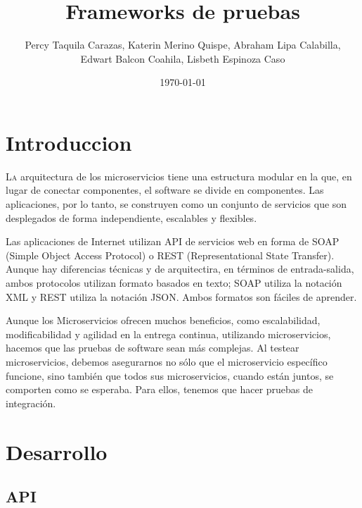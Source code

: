 \documentclass[twoside,twocolumn]{article}
\title{Frameworks de pruebas}
\author{Percy Taquila Carazas, Katerin Merino Quispe, Abraham Lipa Calabilla,
\\Edwart Balcon Coahila, Lisbeth Espinoza Caso}
\date{\today}
\begin{document}
\maketitle


\section{Introduccion}


\lettrine[nindent=0em,lines=3]{L}a arquitectura de los microservicios tiene una estructura modular en la que, en lugar de conectar componentes, el software se divide en componentes. Las aplicaciones, por lo tanto, se construyen como un conjunto de servicios que son desplegados de forma independiente, escalables y flexibles.

Las aplicaciones de Internet utilizan API de servicios web en forma de SOAP (Simple Object Access Protocol) o REST (Representational State Transfer). Aunque hay diferencias técnicas y de arquitectira, en términos de entrada-salida, ambos protocolos utilizan formato basados en texto; SOAP utiliza la notación XML y REST utiliza la notación JSON. Ambos formatos son fáciles de aprender.

Aunque los Microservicios ofrecen muchos beneficios, como escalabilidad, modificabilidad y agilidad en la entrega continua, utilizando microservicios, hacemos que las pruebas de software sean más complejas. Al testear microservicios, debemos asegurarnos no sólo que el microservicio específico funcione, sino también que todos sus microservicios, cuando están juntos, se comporten como se esperaba. Para ellos, tenemos que hacer pruebas de integración. 




\section{Desarrollo}

\subsection{API}
\end{document}

